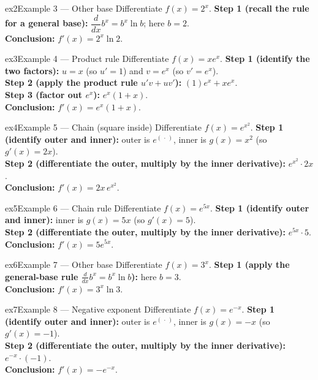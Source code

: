 \documentclass[11pt]{article}
\begin{document}
\begin{example}{ex2}{Example 3 --- Other base}
Differentiate $f(x)=2^x$.\soln
\textbf{Step 1 (recall the rule for a general base):} $\dfrac{d}{dx}b^x=b^x\ln b$; here $b=2$.\\[3pt]
\textbf{Conclusion:} $f'(x)=2^x\ln 2$.
\end{example}

\begin{example}{ex3}{Example 4 --- Product rule}
Differentiate $f(x)=x e^x$.\soln
\textbf{Step 1 (identify the two factors):} $u=x$ (so $u'=1$) and $v=e^x$ (so $v'=e^x$).\\[3pt]
\textbf{Step 2 (apply the product rule $u'v+uv'$):} $(1)e^x+x e^x$.\\[3pt]
\textbf{Step 3 (factor out $e^x$):} $e^x(1+x)$.\\[3pt]
\textbf{Conclusion:} $f'(x)=e^x(1+x)$.
\end{example}

\begin{example}{ex4}{Example 5 --- Chain (square inside)}
Differentiate $f(x)=e^{x^2}$.\soln
\textbf{Step 1 (identify outer and inner):} outer is $e^{(\,\cdot\,)}$, inner is $g(x)=x^2$ (so $g'(x)=2x$).\\[3pt]
\textbf{Step 2 (differentiate the outer, multiply by the inner derivative):} $e^{x^2}\cdot2x$.\\[3pt]
\textbf{Conclusion:} $f'(x)=2x\,e^{x^2}$.
\end{example}

\begin{example}{ex5}{Example 6 --- Chain rule}
Differentiate $f(x)=e^{5x}$.\soln
\textbf{Step 1 (identify outer and inner):} inner is $g(x)=5x$ (so $g'(x)=5$).\\[3pt]
\textbf{Step 2 (differentiate the outer, multiply by the inner derivative):} $e^{5x}\cdot5$.\\[3pt]
\textbf{Conclusion:} $f'(x)=5e^{5x}$.
\end{example}

\begin{example}{ex6}{Example 7 --- Other base}
Differentiate $f(x)=3^x$.\soln
\textbf{Step 1 (apply the general-base rule $\frac{d}{dx}b^x=b^x\ln b$):} here $b=3$.\\[3pt]
\textbf{Conclusion:} $f'(x)=3^x\ln 3$.
\end{example}

\begin{example}{ex7}{Example 8 --- Negative exponent}
Differentiate $f(x)=e^{-x}$.\soln
\textbf{Step 1 (identify outer and inner):} outer is $e^{(\,\cdot\,)}$, inner is $g(x)=-x$ (so $g'(x)=-1$).\\[3pt]
\textbf{Step 2 (differentiate the outer, multiply by the inner derivative):} $e^{-x}\cdot(-1)$.\\[3pt]
\textbf{Conclusion:} $f'(x)=-e^{-x}$.
\end{example}
\end{document}
